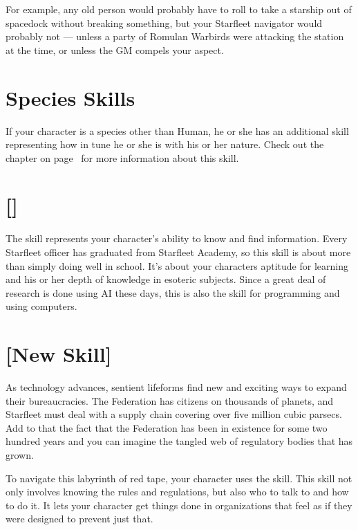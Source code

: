 \documentclass[12pt,titlepage,openany]{book}
\begin{document}
For example, any old person would probably have to roll  to take a
 starship out of spacedock without breaking something, but
your Starfleet navigator would probably not --- unless a party of Romulan
Warbirds were attacking the station at the time, or unless the GM compels your
 aspect.

\section{Species Skills}\label{sec:species-skills}
If your character is a species other than Human, he or she has an additional
skill representing how in tune he or she is with his or her nature. Check out
the chapter  on page~\pageref{chap:species} for more
information about this skill.

\section{ []}\label{sec:academics}
The  skill represents your character's ability to know and
find information. Every Starfleet officer has graduated from Starfleet Academy,
so this skill is about more than simply doing well in school. It's about your
characters aptitude for learning and his or her depth of knowledge in esoteric
subjects. Since a great deal of research is done using AI these days, this is
also the skill for programming and using computers.

\section{ [New Skill]}\label{sec:bureaucracy}
As technology advances, sentient lifeforms find new and exciting ways to expand
their bureaucracies. The Federation has citizens on thousands of planets, and
Starfleet must deal with a supply chain covering over five million cubic
parsecs. Add to that the fact that the Federation has been in existence for
some two hundred years and you can imagine the tangled web of regulatory bodies
that has grown.

To navigate this labyrinth of red tape, your character uses the
 skill. This skill not only involves knowing the rules and
regulations, but also who to talk to and how to do it. It lets your character
get things done in organizations that feel as if they were designed to prevent
just that.
\end{document}
